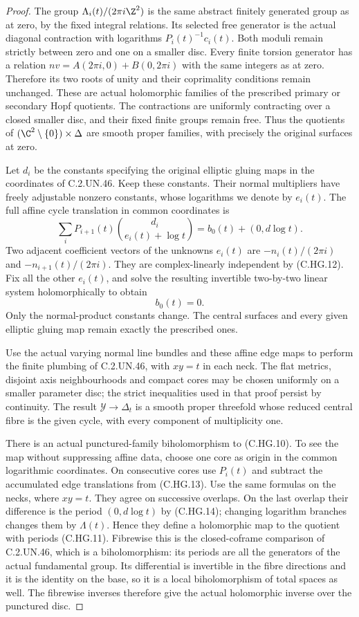 \begin{proof}
The group $\Lambda_i(t)/(2\pi i\Z^2)$ is
the same abstract finitely generated group
as at zero, by the fixed integral relations.
Its selected free generator is the actual
diagonal contraction with logarithms
$P_i(t)^{-1}c_i(t)$. Both moduli remain
strictly between zero and one on a smaller
disc. Every finite torsion generator has
a relation $n v=A(2\pi i,0)+B(0,2\pi i)$
with the same integers as at zero. Therefore
its two roots of unity and their coprimality
conditions remain unchanged. These are
actual holomorphic families of the prescribed
primary or secondary Hopf quotients. The
contractions are uniformly contracting over
a closed smaller disc, and their fixed
finite groups remain free. Thus the
quotients of $(\C^2\setminus\{0\})\times\Delta$
are smooth proper families, with precisely
the original surfaces at zero.

Let $d_i$ be the constants specifying the
original elliptic gluing maps in the
coordinates of C.2.UN.46. Keep these constants.
Their normal multipliers have freely
adjustable nonzero constants, whose logarithms
we denote by $e_i(t)$. The full affine cycle
translation in common coordinates is
\[
 \sum_iP_{i+1}(t)
        \binom{d_i}{e_i(t)+\log t}
       =b_0(t)+(0,d\log t).
\tag{C.HG.13}
\]
Two adjacent coefficient vectors of the
unknowns $e_i(t)$ are
$-n_i(t)/(2\pi i)$ and $-n_{i+1}(t)/(2\pi i)$.
They are complex-linearly independent by
(C.HG.12). Fix all the other $e_i(t)$, and
solve the resulting invertible two-by-two
linear system holomorphically to obtain
\[
                              b_0(t)=0.
\tag{C.HG.14}
\]
Only the normal-product constants change.
The central surfaces and every given
elliptic gluing map remain exactly the
prescribed ones.

Use the actual varying normal line bundles
and these affine edge maps to perform the
finite plumbing of C.2.UN.46, with $xy=t$
in each neck. The flat metrics, disjoint
axis neighbourhoods and compact cores may
be chosen uniformly on a smaller parameter
disc; the strict inequalities used in that
proof persist by continuity. The result
$\mathcal Y\to\Delta_t$ is a smooth proper
threefold whose reduced central fibre is
the given cycle, with every component
of multiplicity one.

There is an actual punctured-family
biholomorphism to (C.HG.10). To see the map
without suppressing affine data, choose one
core as origin in the common logarithmic
coordinates. On consecutive cores use
$P_i(t)$ and subtract the accumulated edge
translations from (C.HG.13). Use the same
formulas on the necks, where $xy=t$.
They agree on successive overlaps. On the
last overlap their difference is the
period $(0,d\log t)$ by (C.HG.14);
changing logarithm branches changes them
by $\Lambda(t)$. Hence they define a
holomorphic map to the quotient with
periods (C.HG.11). Fibrewise this is the
closed-coframe comparison of C.2.UN.46,
which is a biholomorphism: its periods
are all the generators of the actual
fundamental group. Its differential is
invertible in the fibre directions and
it is the identity on the base, so it
is a local biholomorphism of total
spaces as well. The fibrewise inverses
therefore give the actual holomorphic
inverse over the punctured disc.


\end{proof}
